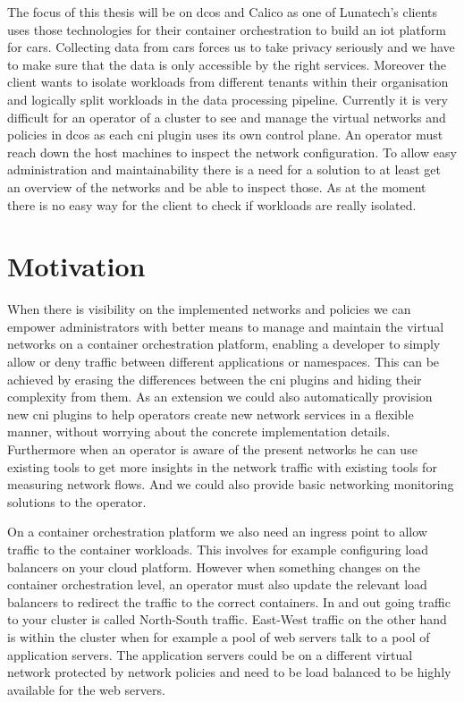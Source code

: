 The focus of this thesis will be on \gls{dcos} and Calico as one of Lunatech's clients uses those technologies for their container orchestration to build an \gls{iot} platform for cars. Collecting data from cars forces us to take privacy seriously and we have to make sure that the data is only accessible by the right services. Moreover the client wants to isolate workloads from different tenants within their organisation and logically split workloads in the data processing pipeline. Currently it is very difficult for an operator of a cluster to see and manage the virtual networks and policies in \gls{dcos} as each \gls{cni} plugin uses its own control plane. An operator must reach down the host machines to inspect the network configuration. To allow easy administration and maintainability there is a need for a solution to at least get an overview of the networks and be able to inspect those. As at the moment there is no easy way for the client to check if workloads are really isolated. 

\section{Motivation}
\label{motiviation}
When there is visibility on the implemented networks and policies we can empower administrators with better means to manage and maintain the virtual networks on a container orchestration platform, enabling a developer to simply allow or deny traffic between different applications or namespaces. This can be achieved by erasing the differences between the \gls{cni} plugins and hiding their complexity from them. As an extension we could also automatically provision new \gls{cni} plugins to help operators create new network services in a flexible manner, without worrying about the concrete implementation details. Furthermore when an operator is aware of the present networks he can use existing tools to get more insights in the network traffic with existing tools for measuring network flows. And we could also provide basic networking monitoring solutions to the operator.

On a container orchestration platform we also need an ingress point to allow traffic to the container workloads. This involves for example configuring load balancers on your cloud platform. However when something changes on the container orchestration level, an operator must also update the relevant load balancers to redirect the traffic to the correct containers. In and out going traffic to your cluster is called North-South traffic. East-West traffic on the other hand is within the cluster when for example a pool of web servers talk to a pool of application servers. The application servers could be on a different virtual network protected by network policies and need to be load balanced to be highly available for the web servers.

